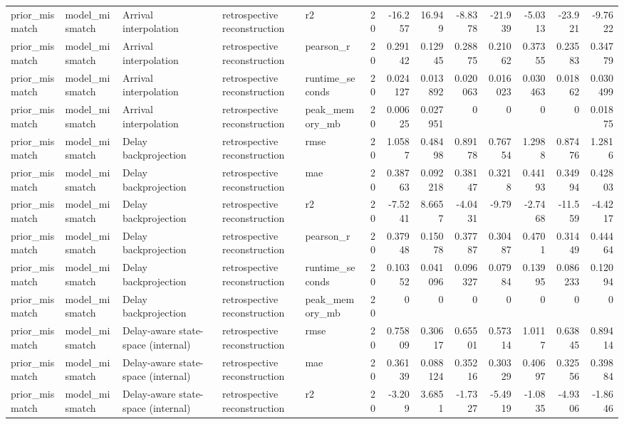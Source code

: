 \begin{table}[!htbp]
{{\begin{tabular}{lllllrrrrrrrr}
prior_mismatch & model_mismatch & Arrival interpolation & retrospective reconstruction & r2 & 20 & -16.257 & 16.949 & -8.8378 & -21.939 & -5.0313 & -23.921 & -9.7622 \\
prior_mismatch & model_mismatch & Arrival interpolation & retrospective reconstruction & pearson_r & 20 & 0.29142 & 0.12945 & 0.28875 & 0.21062 & 0.37355 & 0.23583 & 0.34779 \\
prior_mismatch & model_mismatch & Arrival interpolation & retrospective reconstruction & runtime_seconds & 20 & 0.024127 & 0.013892 & 0.020063 & 0.016023 & 0.030463 & 0.01862 & 0.030499 \\
prior_mismatch & model_mismatch & Arrival interpolation & retrospective reconstruction & peak_memory_mb & 20 & 0.00625 & 0.027951 & 0 & 0 & 0 & 0 & 0.01875 \\
prior_mismatch & model_mismatch & Delay backprojection & retrospective reconstruction & rmse & 20 & 1.0587 & 0.48498 & 0.89178 & 0.76754 & 1.2988 & 0.87476 & 1.2816 \\
prior_mismatch & model_mismatch & Delay backprojection & retrospective reconstruction & mae & 20 & 0.38763 & 0.092218 & 0.38147 & 0.3218 & 0.44193 & 0.34994 & 0.42803 \\
prior_mismatch & model_mismatch & Delay backprojection & retrospective reconstruction & r2 & 20 & -7.5241 & 8.6657 & -4.0431 & -9.79 & -2.7468 & -11.559 & -4.4217 \\
prior_mismatch & model_mismatch & Delay backprojection & retrospective reconstruction & pearson_r & 20 & 0.37948 & 0.15078 & 0.37787 & 0.30487 & 0.4701 & 0.31449 & 0.44464 \\
prior_mismatch & model_mismatch & Delay backprojection & retrospective reconstruction & runtime_seconds & 20 & 0.10352 & 0.041096 & 0.096327 & 0.07984 & 0.13995 & 0.086233 & 0.12094 \\
prior_mismatch & model_mismatch & Delay backprojection & retrospective reconstruction & peak_memory_mb & 20 & 0 & 0 & 0 & 0 & 0 & 0 & 0 \\
prior_mismatch & model_mismatch & Delay-aware state-space (internal) & retrospective reconstruction & rmse & 20 & 0.75809 & 0.30617 & 0.65501 & 0.57314 & 1.0117 & 0.63845 & 0.89414 \\
prior_mismatch & model_mismatch & Delay-aware state-space (internal) & retrospective reconstruction & mae & 20 & 0.36139 & 0.088124 & 0.35216 & 0.30329 & 0.40697 & 0.32556 & 0.39884 \\
prior_mismatch & model_mismatch & Delay-aware state-space (internal) & retrospective reconstruction & r2 & 20 & -3.209 & 3.6851 & -1.7327 & -5.4919 & -1.0835 & -4.9306 & -1.8646 \\

\end{tabular}}}
\end{table}
